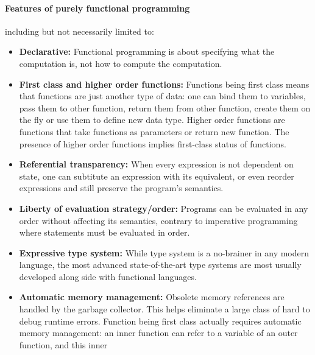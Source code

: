 \documentclass[../gr-final.tex]{subfiles}
\begin{document}
\paragraph {Features of purely functional programming}including but not
necessarily limited to:
\begin{itemize}
       \item {\bfseries Declarative: } Functional programming is
               about specifying what the computation is, not how
               to compute the computation.
       \item {\bfseries First class and higher order functions: }
               Functions being first class means that functions
               are just another type of data: one can bind them
               to variables, pass them to other function,
               return them from other function, create them on
               the fly or use them to
               define new data type. Higher order functions are
               functions that take functions as parameters or
               return new function. The presence of higher order 
               functions implies first-class status of functions.
       \item {\bfseries Referential transparency: } When every
               expression is not dependent on state, one can
               subtitute an expression with its equivalent, or
               even reorder expressions and still preserve the
               program's semantics.
       \item {\bfseries Liberty of evaluation strategy/order: }
               Programs can be evaluated in any order without
               affecting its semantics, contrary to imperative
               programming where statements must be evaluated in
               order. 
       \item {\bfseries Expressive type system: } While type
               system is a no-brainer in any modern language,
               the most advanced state-of-the-art type systems
               are most usually developed along side with
               functional languages. 
       \item {\bfseries Automatic memory management: } Obsolete
               memory references are handled by the garbage
               collector. This helps eliminate a large class of
               hard to debug runtime errors. Function being first
               class actually requires automatic memory
               management: an inner function can refer to a
               variable of an outer function, and this inner

\end{itemize}
\end{document}
